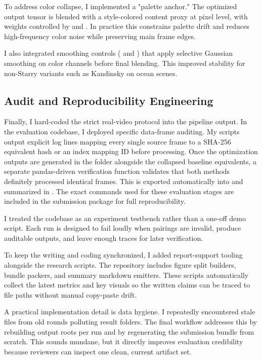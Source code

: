 \documentclass[12pt,letterpaper]{article}
\begin{document}
To address color collapse, I implemented a "palette anchor." The optimized output tensor is blended with a style-colored content proxy at pixel level, with weights controlled by  and . In practice this constrains palette drift and reduces high-frequency color noise while preserving main frame edges.

I also integrated smoothing controls ( and ) that apply selective Gaussian smoothing on color channels before final blending. This improved stability for non-Starry variants such as Kandinsky on ocean scenes.

\subsection{Audit and Reproducibility Engineering}

Finally, I hard-coded the strict real-video protocol into the pipeline output. In the evaluation codebase, I deployed specific data-frame auditing. My scripts output explicit log lines mapping every single source frame to a SHA-256 equivalent hash or an index mapping ID before processing. Once the optimization outputs are generated in the  folder alongside the collapsed baseline equivalents, a separate pandas-driven verification function validates that both methods definitely processed identical frames. This is exported automatically into  and summarized in . The exact commands used for these evaluation stages are included in the submission package for full reproducibility.

I treated the codebase as an experiment testbench rather than a one-off demo script. Each run is designed to fail loudly when pairings are invalid, produce auditable outputs, and leave enough traces for later verification.

To keep the writing and coding synchronized, I added report-support tooling alongside the research scripts. The repository includes figure split builders, bundle packers, and summary markdown emitters. These scripts automatically collect the latest metrics and key visuals so the written claims can be traced to file paths without manual copy-paste drift.

A practical implementation detail is data hygiene. I repeatedly encountered stale files from old rounds polluting result folders. The final workflow addresses this by rebuilding output roots per run and by regenerating the submission bundle from scratch. This sounds mundane, but it directly improves evaluation credibility because reviewers can inspect one clean, current artifact set.
\end{document}
